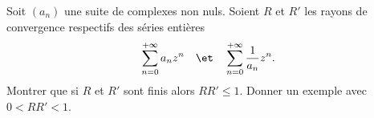 \begin{enonce}
\begin{exercise}[ID={RMS126 E776},subtitle={Centrale PSI 2015},tags={}, difficulty={0}]
Soit $\left( a_n \right)$ une suite de complexes non nuls.
Soient $R$ et $R'$ les rayons de convergence respectifs des séries entières 
\begin{equation*}
  \sum_{n=0}^{+\infty} a_n z^n \quad\et\quad \sum_{n=0}^{+\infty} \frac1{a_n} z^n.
\end{equation*}
Montrer que si $R$ et $R'$ sont finis alors $RR'\leq 1$.
Donner un exemple avec $0<RR'<1$.
\end{exercise}
\begin{solution}
\end{solution}
\end{enonce}
